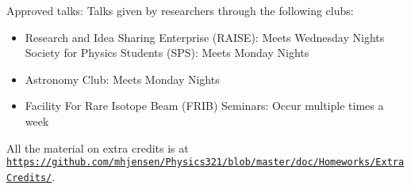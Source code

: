 \documentclass[%
oneside,                 %
final,                   %
10pt]{article}
\begin{document}
\noindent
Approved talks:
Talks given by researchers through the following clubs:
\begin{itemize}
\item Research and Idea Sharing Enterprise (RAISE)​: Meets Wednesday Nights Society for Physics Students (SPS)​: Meets Monday Nights

\item Astronomy Club​: Meets Monday Nights

\item Facility For Rare Isotope Beam (FRIB) Seminars: ​Occur multiple times a week
\end{itemize}

\noindent
All the material on extra credits is at \href{{https://github.com/mhjensen/Physics321/blob/master/doc/Homeworks/ExtraCredits/}}{\nolinkurl{https://github.com/mhjensen/Physics321/blob/master/doc/Homeworks/ExtraCredits/}}. 


\end{document}
